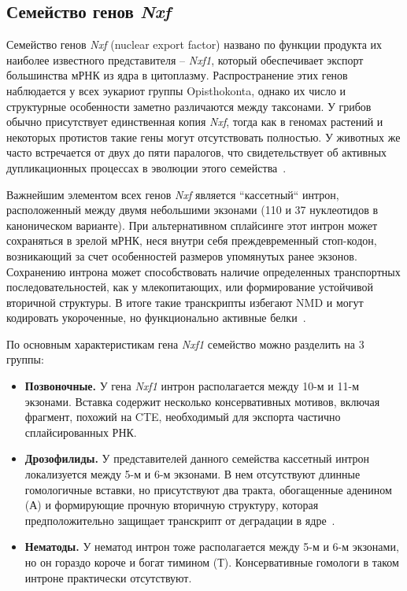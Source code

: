 \subsection{Семейство генов \textit{Nxf}}

Семейство генов \textit{Nxf} (nuclear export factor) названо по функции продукта их наиболее известного представителя – \textit{Nxf1}, который обеспечивает экспорт большинства мРНК из ядра в цитоплазму.
Распространение этих генов наблюдается у всех эукариот группы Opisthokonta, однако их число и структурные особенности заметно различаются между таксонами.
У грибов обычно присутствует единственная копия \textit{Nxf}, тогда как в геномах растений и некоторых протистов такие гены могут отсутствовать полностью.
У животных же часто встречается от двух до пяти паралогов, что свидетельствует об активных дупликационных процессах в эволюции этого семейства~\cite{Mamon2013}.

Важнейшим элементом всех генов \textit{Nxf} является ``кассетный`` интрон, расположенный между двумя небольшими экзонами (110 и 37 нуклеотидов в каноническом варианте).
При альтернативном сплайсинге этот интрон может сохраняться в зрелой мРНК, неся внутри себя преждевременный стоп-кодон, возникающий за счет особенностей размеров упомянутых ранее экзонов.
Сохранению интрона может способствовать наличие определенных транспортных последовательностей, как у млекопитающих, или формирование устойчивой вторичной структуры.
В итоге такие транскрипты избегают NMD и могут кодировать укороченные, но функционально активные белки~\cite{Mamon2013,Golubkova2012}.

По основным характеристикам гена \textit{Nxf1} семейство можно разделить на 3 группы:

\begin{itemize}
  \item \textbf{Позвоночные.} У гена \textit{Nxf1} интрон располагается между 10-м и 11-м экзонами. Вставка содержит несколько консервативных мотивов, включая фрагмент, похожий на CTE, необходимый для экспорта частично сплайсированных РНК.
  \item \textbf{Дрозофилиды.} У представителей данного семейства кассетный интрон локализуется между 5-м и 6-м экзонами. В нем отсутствуют длинные гомологичные вставки, но присутствуют два тракта, обогащенные аденином (А) и формирующие прочную вторичную структуру, которая предположительно защищает транскрипт от деградации в ядре~\cite{Mamon2013}.
  \item \textbf{Нематоды.} У нематод интрон тоже располагается между 5-м и 6-м экзонами, но он гораздо короче и богат тимином (Т). Консервативные гомологи в таком интроне практически отсутствуют.
\end{itemize}

